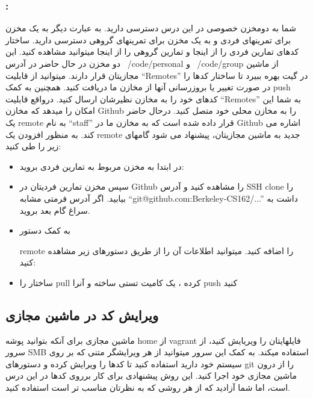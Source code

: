 \subsubsection{
:
}
شما به دومخزن خصوصی در این درس دسترسی دارید. به عبارت دیگر به یک مخزن برای تمرینهای فردی و به یک مخزن برای تمرینهای گروهی دسترسی دارید.
ساختار کدهای تمارین فردی را از اینجا و تمارین گروهی را از اینجا میتوانید مشاهده کنید. این دو مخزن در حال حاضر در آدرس ~/code/personal و ~/code/group از ماشین مجازیتان قرار دارند.
میتوانید از قابلیت “Remotes” در گیت بهره ببیرد تا ساختار کدها را در صورت تغییر یا بروزرسانی آنها از مخازن ما دریافت کنید. همچنین به کمک push کدهای خود را به مخازن نظیرشان ارسال کنید. درواقع قابلیت “Remotes” به شما این امکان را میدهد که مخازن Github را به مخازن محلی خود متصل کنید. درحال حاضر یک remote به نام “staff” قرار داده شده است که به مخازن ما در Github اشاره می کند.
به منظور افزودن یک remote جدید به ماشین مجازیتان، پیشنهاد می شود گامهای زیر را طی کنید:

\begin{itemize}
\item
در ابتدا به مخزن مربوط به تمارین فردی بروید:\begin{flushleft}
\end{flushleft}
\item
سپس مخزن تمارین فردیتان در Github را مشاهده کنید و آدرس SSH clone را بیابید. اگر آدرس فرمتی مشابه “git@github.com:Berkeley-CS162/...” داشت به سراغ گام بعد بروید.
\item
به کمک دستور \begin{flushleft}
\end{flushleft} remote را اضافه کنید.
میتوانید اطلاعات آن را از طریق دستورهای زیر مشاهده کنید:
\begin{flushleft}
\end{flushleft}
\item
ساختار را pull کرده ، یک کامیت تستی ساخته و آنرا push کنید
\begin{flushleft}
\end{flushleft}
\end{itemize}

\subsection{ویرایش کد در ماشین مجازی}
ماشین مجازی برای آنکه بتوانید پوشه home از vagrant فایلهایتان را ویریایش کنید، از سرور SMB استفاده میکند. به کمک این سرور میتوانید از هر ویرایشگر متنی که بر روی سیستم خود دارید استفاده کنید تا کدها را ویرایش کرده و دستورهای git را از درون ماشین مجازی خود اجرا کنید.
این روش پیشنهادی برای کار برروی کدها در این درس است، اما شما آزادید که از هر روشی که به نظرتان مناسب تر است استفاده کنید.

